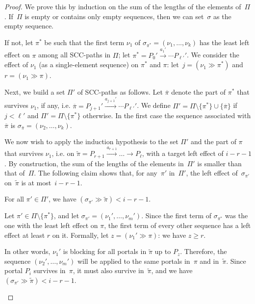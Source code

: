 \documentclass[letterpaper, USenglish, cleveref, autoref, thm-restate, numberwithinsect]{lipics-v2021}
\theoremstyle{theorem}
\theoremstyle{definition}
\newcommand{\lefteffect}[2]{(#1 \gg #2)}
\newcommand{\SCCpath}{\pi}
\newcommand{\set}[1]{\{ #1 \}}
\begin{document}
\begin{proof}
	We prove this by induction on the sum of the lengths of the elements of~$\Pi$.
	If~$\Pi$ is empty or contains only empty sequences, then we can set~$\sigma$ as the empty sequence.
	
	If not, let $\SCCpath^*$ be such that the first term $\nu_1$ of $\sigma_{\SCCpath^*} = (\nu_1, \ldots, \nu_k)$ has the least left effect on $\SCCpath$ among all SCC-paths in $\Pi$; let $\SCCpath^* = P_0' \xrightarrow{a_1'} \cdots  P_{\ell'}'$. We consider the effect of $\nu_1$ (as a single-element sequence) on $\SCCpath^*$ and $\SCCpath$: let~$j = \lefteffect{\nu_1}{\SCCpath^*}$ and~$r = \lefteffect{\nu_1}{\SCCpath}$.

	Next, we build a set $\Pi'$ of SCC-paths as follows.
	Let $\overline{\SCCpath}$ denote the part of $\SCCpath^*$ that survives $\nu_1$, if any, i.e. $\overline{\SCCpath} = P_{j+1}' \xrightarrow{a_{j+1}'} \cdots P_{\ell'}'$.
	We define $\Pi' = \Pi \setminus \set{\SCCpath^*} \cup \set{\overline{\SCCpath}}$ if $j<\ell'$ and $\Pi' = \Pi \setminus \set{\SCCpath^*}$ otherwise.
	In the first case the sequence associated with $\overline{\SCCpath}$ is $\sigma_{\overline{\SCCpath}} = (\nu_2, \ldots, \nu_k)$.
	
	We now wish to apply the induction hypothesis to the set $\Pi'$ and the part of $\SCCpath$ that survives $\nu_1$, i.e. on $\tilde{\SCCpath} = P_{r+1}\xrightarrow{a_{r+1}} \ldots \rightarrow P_\ell$, with a target left effect of $i-r-1$.
	By construction, the sum of the lengths of the elements in~$\Pi'$ is smaller than that of~$\Pi$.
	The following claim shows that, for any~$\SCCpath'$ in~$\Pi'$, the left effect of~$\sigma_{\SCCpath'}$ on~$\tilde{\SCCpath}$ is at most~$i-r-1$.

	\begin{claim}
		For all $\SCCpath' \in \Pi'$, we have $\lefteffect{\sigma_{\SCCpath'}}{\tilde{\SCCpath}} < i-r-1$.
	\end{claim}
	
	\begin{claimproof}
		Let $\pi' \in \Pi\setminus \set{\SCCpath^*}$, and let $\sigma_{\SCCpath'} = (\nu_1', \ldots, \nu_m')$.
		Since the first term of $\sigma_{\SCCpath^*}$ was the one with the least left effect on $\SCCpath$, the first term of every other sequence has a left effect at least $r$ on it.
		Formally, let $z = \lefteffect{\nu_1'}{\SCCpath}$: we have $z \ge r$.
		
		In other words, $\nu_1'$ is blocking for all portals in $\tilde{\SCCpath}$ up to $P_z$.
		Therefore, the sequence $(\nu_2', \ldots, \nu_m')$ will be applied to the same portals in~$\SCCpath$ and in~$\tilde{\SCCpath}$. Since portal $P_i$ survives in~$\SCCpath$, it must also survive in~$\tilde{\SCCpath}$, and we have $\lefteffect{\sigma_{\SCCpath'}}{\tilde{\SCCpath}} < i-r-1$.
	\end{claimproof}
		

\end{proof}
\end{document}
